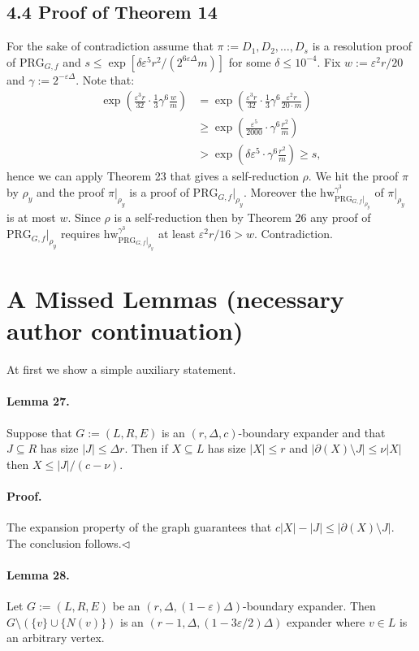 \documentclass[10pt,a4paper]{article}
\begin{document}
\subsection*{4.4 Proof of Theorem 14}
For the sake of contradiction assume that $\pi:=D_1,D_2,\ldots,D_s$ is a resolution proof of $\mathrm{PRG}_{G,f}$ and $s\leq\exp[\delta\varepsilon^5r^2/(2^{6\varepsilon\Delta}m)]$ for some $\delta\leq10^{-4}$.
Fix $w:=\varepsilon^2r/20$ and $\gamma:=2^{-\varepsilon\Delta}$. Note that:
\begin{align*}
\exp\left(\frac{\varepsilon^3r}{32}\cdot\frac13\gamma^6\frac wm\right)
&=\exp\left(\frac{\varepsilon^3r}{32}\cdot\frac13\gamma^6\frac{\varepsilon^2r}{20\cdot m}\right)\\
&\geq\exp\left(\frac{\varepsilon^5}{2000}\cdot\gamma^6\frac{r^2}m\right)\\
&>\exp\left(\delta\varepsilon^5\cdot\gamma^6\frac{r^2}m\right)\geq s,
\end{align*}
hence we can apply Theorem 23 that gives a self-reduction $\rho$. We hit the proof $\pi$ by $\rho_y$ and the proof $\pi|_{\rho_y}$ is a proof of $\mathrm{PRG}_{G,f}|_{\rho_y}$. Moreover the $\mathrm{hw}_{\mathrm{PRG}_{G,f}|_{\rho_y}}^{\gamma^3}$ of $\pi|_{\rho_y}$ is at most $w$.
Since $\rho$ is a self-reduction then by Theorem 26 any proof of $\mathrm{PRG}_{G,f}|_{\rho_y}$ requires $\mathrm{hw}_{\mathrm{PRG}_{G,f}|_{\rho_y}}^{\gamma^3}$ at least $\varepsilon^2r/16>w$. Contradiction.

\section*{A Missed Lemmas (necessary author continuation)}
At first we show a simple auxiliary statement.
\paragraph{Lemma 27.} Suppose that $G:=(L,R,E)$ is an $(r,\Delta,c)$-boundary expander and that $J\subseteq R$ has size $|J|\leq\Delta r$. Then if $X\subseteq L$ has size $|X|\leq r$ and $|\partial(X)\setminus J|\leq\nu|X|$ then $X\leq|J|/(c-\nu)$.
\paragraph{Proof.} The expansion property of the graph guarantees that $c|X|-|J|\leq|\partial(X)\setminus J|$. The conclusion follows.\hfill$\triangleleft$
\paragraph{Lemma 28.} Let $G:=(L,R,E)$ be an $(r,\Delta,(1-\varepsilon)\Delta)$-boundary expander. Then $G\setminus(\{v\}\cup\{N(v)\})$ is an $(r-1,\Delta,(1-3\varepsilon/2)\Delta)$ expander where $v\in L$ is an arbitrary vertex.
\end{document}
